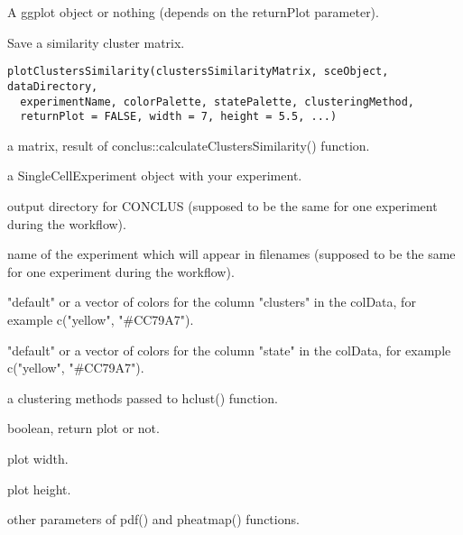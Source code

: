 \documentclass[a4paper]{book}
\begin{document}
%
\begin{Value}
A ggplot object or nothing (depends on the returnPlot parameter).
\end{Value}
%
\begin{Description}\relax
Save a similarity cluster matrix.
\end{Description}
%
\begin{Usage}
\begin{verbatim}
plotClustersSimilarity(clustersSimilarityMatrix, sceObject, dataDirectory,
  experimentName, colorPalette, statePalette, clusteringMethod,
  returnPlot = FALSE, width = 7, height = 5.5, ...)
\end{verbatim}
\end{Usage}
%
\begin{Arguments}
\begin{ldescription}
\item[\code{clustersSimilarityMatrix}] a matrix, result of conclus::calculateClustersSimilarity() function.

\item[\code{sceObject}] a SingleCellExperiment object with your experiment.

\item[\code{dataDirectory}] output directory for CONCLUS (supposed to be the same for one experiment during the workflow).

\item[\code{experimentName}] name of the experiment which will appear in filenames (supposed to be the same for one experiment during the workflow).

\item[\code{colorPalette}] "default" or a vector of colors for the column "clusters" in the colData, for example c("yellow", "\#CC79A7").

\item[\code{statePalette}] "default" or a vector of colors for the column "state" in the colData, for example c("yellow", "\#CC79A7").

\item[\code{clusteringMethod}] a clustering methods passed to hclust() function.

\item[\code{returnPlot}] boolean, return plot or not.

\item[\code{width}] plot width.

\item[\code{height}] plot height.

\item[\code{...}] other parameters of pdf() and pheatmap() functions.
\end{ldescription}
\end{Arguments}
\end{document}
